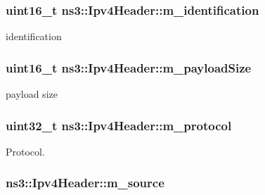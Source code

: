 \subsubsection[{\texorpdfstring{m\+\_\+identification}{m_identification}}]{\setlength{\rightskip}{0pt plus 5cm}uint16\+\_\+t ns3\+::\+Ipv4\+Header\+::m\+\_\+identification\hspace{0.3cm}{\ttfamily [private]}}\hypertarget{classns3_1_1Ipv4Header_a4cff3bd3c1fa0464a4f8940014e8fa5e}{}\label{classns3_1_1Ipv4Header_a4cff3bd3c1fa0464a4f8940014e8fa5e}


identification 

\subsubsection[{\texorpdfstring{m\+\_\+payload\+Size}{m_payloadSize}}]{\setlength{\rightskip}{0pt plus 5cm}uint16\+\_\+t ns3\+::\+Ipv4\+Header\+::m\+\_\+payload\+Size\hspace{0.3cm}{\ttfamily [private]}}\hypertarget{classns3_1_1Ipv4Header_a5d09939d73631fa3981ec4dfb6cc3481}{}\label{classns3_1_1Ipv4Header_a5d09939d73631fa3981ec4dfb6cc3481}


payload size 

\subsubsection[{\texorpdfstring{m\+\_\+protocol}{m_protocol}}]{\setlength{\rightskip}{0pt plus 5cm}uint32\+\_\+t ns3\+::\+Ipv4\+Header\+::m\+\_\+protocol\hspace{0.3cm}{\ttfamily [private]}}\hypertarget{classns3_1_1Ipv4Header_a2f5b8e55ff90bbcd93755a127fb0e2f1}{}\label{classns3_1_1Ipv4Header_a2f5b8e55ff90bbcd93755a127fb0e2f1}


Protocol. 

\subsubsection[{\texorpdfstring{m\+\_\+source}{m_source}}]{ ns3\+::\+Ipv4\+Header\+::m\+\_\+source\hspace{0.3cm}{\ttfamily [private]}}\hypertarget{classns3_1_1Ipv4Header_a091c4da29779b7e0f4b4a486d04ed012}{}\label{classns3_1_1Ipv4Header_a091c4da29779b7e0f4b4a486d04ed012}



